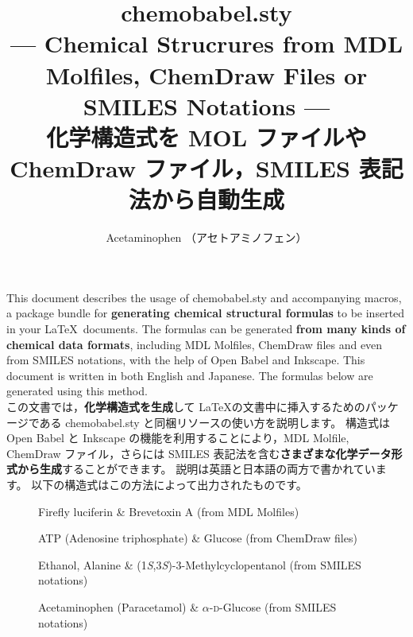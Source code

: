 \documentclass[12pt]{jsarticle}
\title{\textsf{chemobabel.sty} \\[1ex] \normalsize --- Chemical Strucrures from MDL Molfiles, ChemDraw Files or SMILES Notations --- \\ 化学構造式を MOL ファイルや ChemDraw ファイル，SMILES 表記法から自動生成}
\author{Acetaminophen （アセトアミノフェン）}
\begin{document}
\renewcommand{\figurename}{Fig.\,}
\maketitle

This document describes the usage of \textsf{chemobabel.sty} and accompanying macros, a package bundle for \textbf{generating chemical structural formulas} to be inserted in your \LaTeX\ documents.
The formulas can be generated \textbf{from many kinds of chemical data formats}, including MDL Molfiles, ChemDraw files and even from SMILES notations, with the help of Open Babel and Inkscape.
This document is written in both English and Japanese.
The formulas below are generated using this method. \\

この文書では，\textbf{化学構造式を生成}して \LaTeX の文書中に挿入するためのパッケージである \textsf{chemobabel.sty} と同梱リソースの使い方を説明します。
構造式は Open Babel と Inkscape の機能を利用することにより，MDL Molfile, ChemDraw ファイル，さらには SMILES 表記法を含む\textbf{さまざまな化学データ形式から生成}することができます。
説明は英語と日本語の両方で書かれています。
以下の構造式はこの方法によって出力されたものです。 \\

\begin{figure}[ht]
  \centering
  \caption{Firefly luciferin \& Brevetoxin A (from MDL Molfiles)}
\end{figure}

\begin{figure}[ht]
  \centering
  \caption{ATP (Adenosine triphosphate) \& Glucose (from ChemDraw files)}
\end{figure}

\begin{figure}[ht]
  \centering
  \caption{Ethanol, Alanine \& (1\textit{S},3\textit{S})-3-Methylcyclopentanol (from SMILES notations)}
\end{figure}

\begin{figure}[ht]
  \centering
  \caption{Acetaminophen (Paracetamol) \& $\alpha$-\textsc{d}-Glucose (from SMILES notations)}
\end{figure}
\end{document}
